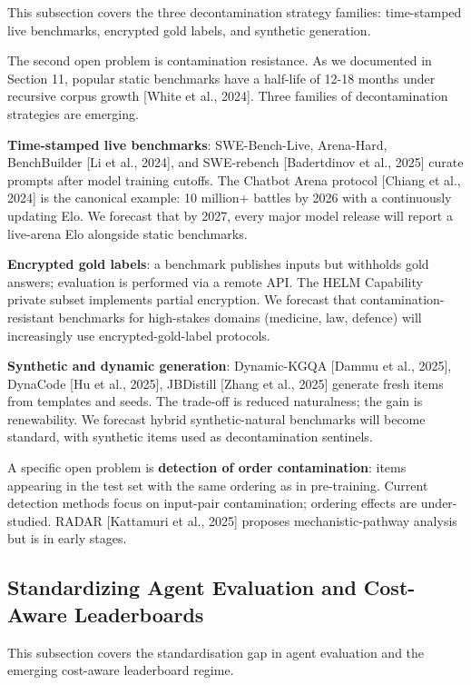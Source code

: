 This subsection covers the three decontamination strategy families: time-stamped live benchmarks, encrypted gold labels, and synthetic generation.

The second open problem is contamination resistance. As we documented in Section 11, popular static benchmarks have a half-life of 12-18 months under recursive corpus growth {[}White et al., 2024{]}. Three families of decontamination strategies are emerging.

\textbf{Time-stamped live benchmarks}: SWE-Bench-Live, Arena-Hard, BenchBuilder {[}Li et al., 2024{]}, and SWE-rebench {[}Badertdinov et al., 2025{]} curate prompts after model training cutoffs. The Chatbot Arena protocol {[}Chiang et al., 2024{]} is the canonical example: 10 million+ battles by 2026 with a continuously updating Elo. We forecast that by 2027, every major model release will report a live-arena Elo alongside static benchmarks.

\textbf{Encrypted gold labels}: a benchmark publishes inputs but withholds gold answers; evaluation is performed via a remote API. The HELM Capability private subset implements partial encryption. We forecast that contamination-resistant benchmarks for high-stakes domains (medicine, law, defence) will increasingly use encrypted-gold-label protocols.

\textbf{Synthetic and dynamic generation}: Dynamic-KGQA {[}Dammu et al., 2025{]}, DynaCode {[}Hu et al., 2025{]}, JBDistill {[}Zhang et al., 2025{]} generate fresh items from templates and seeds. The trade-off is reduced naturalness; the gain is renewability. We forecast hybrid synthetic-natural benchmarks will become standard, with synthetic items used as decontamination sentinels.

A specific open problem is \textbf{detection of order contamination}: items appearing in the test set with the same ordering as in pre-training. Current detection methods focus on input-pair contamination; ordering effects are under-studied. RADAR {[}Kattamuri et al., 2025{]} proposes mechanistic-pathway analysis but is in early stages.

\subsection{Standardizing Agent Evaluation and Cost-Aware Leaderboards}\label{standardizing-agent-evaluation-and-cost-aware-leaderboards}

This subsection covers the standardisation gap in agent evaluation and the emerging cost-aware leaderboard regime.

